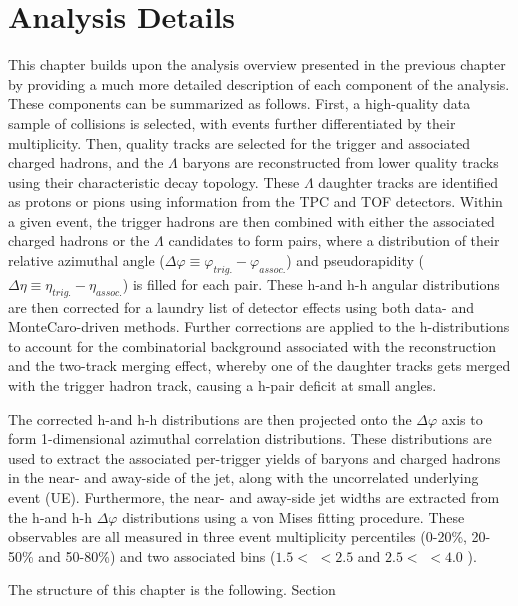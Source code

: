 \chapter{Analysis Details}
\label{chapter_analysis_details}

This chapter builds upon the analysis overview presented in the previous chapter by providing a much more detailed description of each component of the analysis. These components can be summarized as follows. First, a high-quality data sample of \pPb collisions is selected, with events further differentiated by their multiplicity. Then, quality tracks are selected for the trigger and associated charged hadrons, and the $\Lambda$ baryons are reconstructed from lower quality tracks using their characteristic decay topology. These $\Lambda$ daughter tracks are identified as protons or pions using information from the TPC and TOF detectors. Within a given event, the trigger hadrons are then combined with either the associated charged hadrons or the $\Lambda$ candidates to form pairs, where a distribution of their relative azimuthal angle ($\Delta\varphi \equiv \varphi_{trig.} - \varphi_{assoc.}$) and pseudorapidity ($\Delta\eta \equiv \eta_{trig.} - \eta_{assoc.}$) is filled for each pair. These h-\lmb and h-h angular distributions are then corrected for a laundry list of detector effects using both data- and MonteCaro-driven methods. Further corrections are applied to the h-\lmb distributions to account for the combinatorial background associated with the \lmb reconstruction and the two-track merging effect, whereby one of the daughter tracks gets merged with the trigger hadron track, causing a h-\lmb pair deficit at small angles.

The corrected h-\lmb and h-h distributions are then projected onto the $\Delta\varphi$ axis to form 1-dimensional azimuthal correlation distributions. These distributions are used to extract the associated per-trigger yields of \lmb baryons and charged hadrons in the near- and away-side of the jet, along with the uncorrelated underlying event (UE). Furthermore, the near- and away-side jet widths are extracted from the h-\lmb and h-h $\Delta\varphi$ distributions using a von Mises fitting procedure. These observables are all measured in three event multiplicity percentiles (0-20\%, 20-50\% and 50-80\%) and two associated \pt bins ($1.5 <$ \ptassoc $< 2.5$ \GeVc and $2.5 <$ \ptassoc $<4.0$ \GeVc). 

The structure of this chapter is the following. Section \


